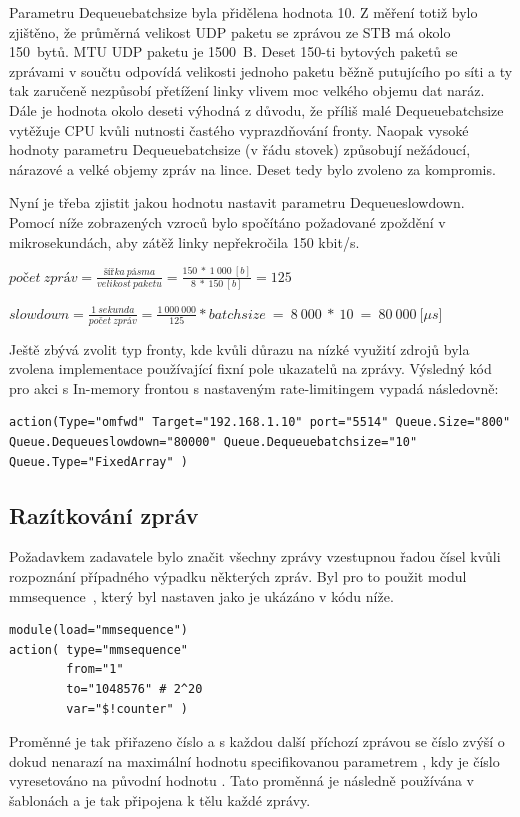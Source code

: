 \documentclass[thesis=B,czech]{FITthesis}[2012/06/26]
\begin{document}
Parametru Dequeuebatchsize byla přidělena hodnota 10. Z měření totiž bylo zjištěno, že průměrná velikost UDP paketu se zprávou ze STB má okolo 150~bytů. MTU UDP paketu je 1500~B. Deset 150-ti bytových paketů se zprávami v součtu odpovídá velikosti jednoho paketu běžně putujícího po síti a ty tak zaručeně nezpůsobí přetížení linky vlivem moc velkého objemu dat naráz.
Dále je hodnota okolo deseti výhodná z důvodu, že příliš malé Dequeuebatchsize vytěžuje CPU kvůli nutnosti častého vyprazdňování fronty. Naopak vysoké hodnoty parametru Dequeuebatchsize (v řádu stovek) způsobují nežádoucí, nárazové a velké objemy zpráv na lince. Deset tedy bylo zvoleno za kompromis.
  
Nyní je třeba zjistit jakou hodnotu nastavit parametru Dequeueslowdown. Pomocí níže zobrazených vzroců bylo spočítáno požadované zpoždění v mikrosekundách, aby zátěž linky nepřekročila 150 kbit/s.

\begin{description}
	\item $počet~zpráv=\frac{šířka~pásma}{velikost~paketu}=\frac{150~*~1~000~[b]}{8~*~150~[b]}=125$
	\item $slowdown=\frac{1~sekunda}{počet~zpráv}=\frac{1~000~000}{125}*batchsize~=~8~000~*~10~=~80~000~[\mu$$s]$
\end{description}
Ještě zbývá zvolit typ fronty, kde kvůli důrazu na nízké využití zdrojů byla zvolena implementace používající fixní pole ukazatelů na zprávy.
Výsledný kód pro akci s In-memory frontou s nastaveným rate-limitingem vypadá následovně:
\begin{lstlisting}[style=RainerScriptSimpleStyle]
action(Type="omfwd" Target="192.168.1.10" port="5514" Queue.Size="800" Queue.Dequeueslowdown="80000" Queue.Dequeuebatchsize="10" Queue.Type="FixedArray" )
\end{lstlisting}

\subsection{Razítkování zpráv}
Požadavkem zadavatele bylo značit všechny zprávy vzestupnou řadou čísel kvůli rozpoznání případného výpadku některých zpráv.
Byl pro to použit modul mmsequence~\cite{RsyslogMmsequence}, který byl nastaven jako je ukázáno v kódu níže.
\begin{lstlisting}[style=RainerScriptSimpleStyle]
module(load="mmsequence")
action(	type="mmsequence"
		from="1"
		to="1048576" # 2^20
		var="$!counter" )
\end{lstlisting}
Proměnné  je tak přiřazeno číslo  a s každou další příchozí zprávou se číslo zvýší o  dokud nenarazí na maximální hodnotu specifikovanou parametrem , kdy je číslo vyresetováno na původní hodnotu .
Tato proměnná je následně používána v šablonách a je tak připojena k tělu každé zprávy.
\end{document}
